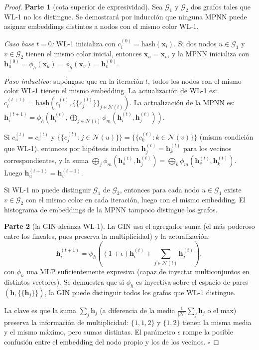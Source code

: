 \begin{proof}
\textbf{Parte 1} (cota superior de expresividad).
Sea $\mathcal{G}_1$ y $\mathcal{G}_2$ dos grafos tales que WL-1 no los distingue.
Se demostrará por inducción que ninguna MPNN puede asignar embeddings distintos
a nodos con el mismo color WL-1.

\textit{Caso base $t=0$:} WL-1 inicializa con $c_i^{(0)} = \mathrm{hash}(\bm{x}_i)$.
Si dos nodos $u \in \mathcal{G}_1$ y $v \in \mathcal{G}_2$ tienen el mismo
color inicial, entonces $\bm{x}_u = \bm{x}_v$, y la MPNN inicializa con
$\bm{h}_u^{(0)} = \phi_h(\bm{x}_u) = \phi_h(\bm{x}_v) = \bm{h}_v^{(0)}$.

\textit{Paso inductivo:} supóngase que en la iteración $t$, todos los nodos
con el mismo color WL-1 tienen el mismo embedding. La actualización de WL-1 es:
$c_i^{(t+1)} = \mathrm{hash}(c_i^{(t)}, \{\!\{c_j^{(t)}\}\!\}_{j\in\mathcal{N}(i)})$.
La actualización de la MPNN es:
$\bm{h}_i^{(t+1)} = \phi_h(\bm{h}_i^{(t)}, \bigoplus_{j\in\mathcal{N}(i)}
\phi_m(\bm{h}_i^{(t)},\bm{h}_j^{(t)}))$.

Si $c_u^{(t)} = c_v^{(t)}$ y $\{\!\{c_j^{(t)}: j\in\mathcal{N}(u)\}\!\} =
\{\!\{c_k^{(t)}: k\in\mathcal{N}(v)\}\!\}$ (misma condición que WL-1), entonces
por hipótesis inductiva $\bm{h}_j^{(t)} = \bm{h}_k^{(t)}$ para los vecinos
correspondientes, y la suma $\bigoplus_j \phi_m(\bm{h}_u^{(t)},\bm{h}_j^{(t)}) =
\bigoplus_k \phi_m(\bm{h}_v^{(t)},\bm{h}_k^{(t)})$. Luego
$\bm{h}_u^{(t+1)} = \bm{h}_v^{(t+1)}$.

Si WL-1 no puede distinguir $\mathcal{G}_1$ de $\mathcal{G}_2$, entonces
para cada nodo $u \in \mathcal{G}_1$ existe $v \in \mathcal{G}_2$ con el
mismo color en cada iteración, luego con el mismo embedding. El histograma
de embeddings de la MPNN tampoco distingue los grafos.

\textbf{Parte 2} (la GIN alcanza WL-1).
La GIN usa el agregador suma (el más poderoso entre los lineales, pues preserva
la multiplicidad) y la actualización:
\[
  \bm{h}_i^{(t+1)} = \phi_h\!\left((1+\epsilon)\bm{h}_i^{(t)}
  + \sum_{j\in\mathcal{N}(i)}\bm{h}_j^{(t)}\right),
\]
con $\phi_h$ una MLP suficientemente expresiva (capaz de inyectar multiconjuntos
en distintos vectores). Se demuestra que si $\phi_h$ es inyectiva sobre el espacio
de pares $(\bm{h}, \{\!\{\bm{h}_j\}\!\})$, la GIN puede distinguir todos los
grafos que WL-1 distingue.

La clave es que la suma $\sum_j \bm{h}_j$ (a diferencia de la media
$\frac{1}{|\mathcal{N}|}\sum_j \bm{h}_j$ o el max) preserva la información de
multiplicidad: $\{1,1,2\}$ y $\{1,2\}$ tienen la misma media y el mismo máximo,
pero sumas distintas. El parámetro $\epsilon$ rompe la posible confusión entre
el embedding del nodo propio y los de los vecinos. $\square$
\end{proof}

